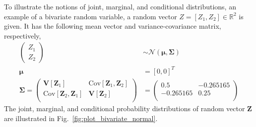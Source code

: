 To illustrate the notions of joint, marginal, and conditional distributions, an example of a bivariate random variable, a random vector $Z = [Z_1, Z_2] \in \mathbb{R}^2$ is given.
It has the following mean vector and variance-covariance matrix, respectively,
\begin{equation}
	\begin{split}
		\begin{pmatrix}
			Z_1 \\
			Z_2
		\end{pmatrix} & \sim \mathcal{N}(\boldsymbol{\mu}, \boldsymbol{\Sigma}) \\
		 \boldsymbol{\mu} & = [0, 0]^T \\
		  \boldsymbol{\Sigma} = 
				\begin{pmatrix}
					\mathbf{V}[\mathbf{Z}_1]                & \text{Cov}[\mathbf{Z}_1, \mathbf{Z}_2]\\
					\text{Cov}[\mathbf{Z}_2, \mathbf{Z}_1]  & \mathbf{V}[\mathbf{Z}_2]\\
			\end{pmatrix} & =
			\begin{pmatrix}
					0.5       & -0.265165\\
					-0.265165 & 0.25\\
			\end{pmatrix}
	\end{split}
\label{eq:ex_bivariate}
\end{equation}
The joint, marginal, and conditional probability distributions of random vector $\mathbf{Z}$ are illustrated in Fig.~\ref{fig:plot_bivariate_normal}.
